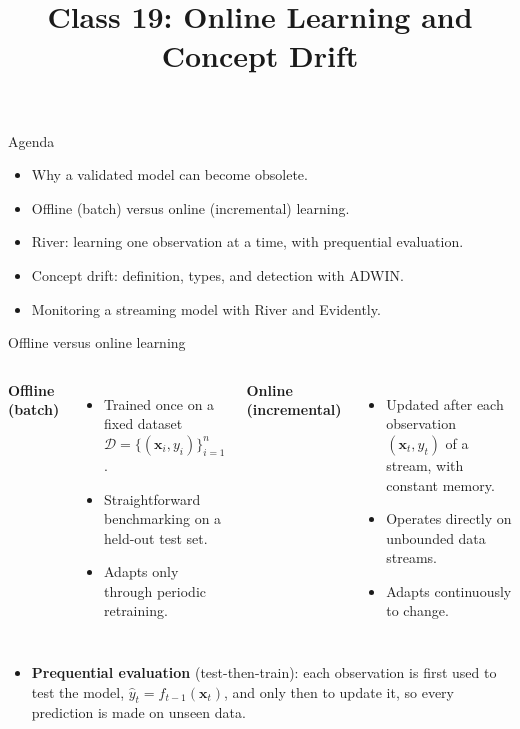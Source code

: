 
\usepackage{amssymb}

\title{Class 19: Online Learning and Concept Drift}
\author{\coursename}
\date{}



\frame{\titlepage \coursefooter}

\begin{frame}{Agenda}
\begin{itemize}
\item Why a validated model can become obsolete.
\item Offline (batch) versus online (incremental) learning.
\item River: learning one observation at a time, with prequential evaluation.
\item Concept drift: definition, types, and detection with ADWIN.
\item Monitoring a streaming model with River and Evidently.
\end{itemize}
\coursefooter
\end{frame}

\begin{frame}{Offline versus online learning}
\begin{columns}[T]
\textbf{Offline (batch)}
\begin{itemize}
\item Trained once on a fixed dataset $\mathcal{D} = \{(\mathbf{x}_i, y_i)\}_{i=1}^{n}$.
\item Straightforward benchmarking on a held-out test set.
\item Adapts only through periodic retraining.
\end{itemize}
\textbf{Online (incremental)}
\begin{itemize}
\item Updated after each observation $(\mathbf{x}_t, y_t)$ of a stream, with constant memory.
\item Operates directly on unbounded data streams.
\item Adapts continuously to change.
\end{itemize}
\end{columns}
\vspace{0.6em}
\begin{itemize}
\item \textbf{Prequential evaluation} (test-then-train): each observation is first used to test the model, $\hat{y}_t = f_{t-1}(\mathbf{x}_t)$, and only then to update it, so every prediction is made on unseen data.
\end{itemize}
\coursefooter
\end{frame}

